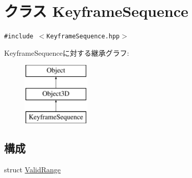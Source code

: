 \hypertarget{classm3g_1_1KeyframeSequence}{
\section{クラス KeyframeSequence}
\label{classm3g_1_1KeyframeSequence}
}
{\tt \#include $<$KeyframeSequence.hpp$>$}

KeyframeSequenceに対する継承グラフ:\begin{figure}[H]
\begin{center}
\leavevmode
\includegraphics[height=3cm]{classm3g_1_1KeyframeSequence}
\end{center}
\end{figure}
\subsection*{構成}
\begin{CompactItemize}
\item 
struct \hyperlink{structm3g_1_1KeyframeSequence_1_1ValidRange}{ValidRange}
\end{CompactItemize}
